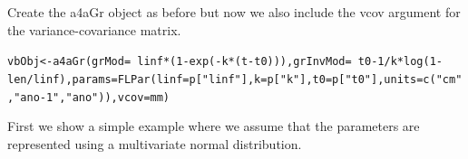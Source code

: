 \documentclass[a4paper,english,10pt]{article}\usepackage[]{graphicx}\usepackage[]{color}
\makeatletter
\newcommand{\hlnum}[1]{\textcolor[rgb]{0.2,0.2,0.2}{#1}}%
\newcommand{\hlstr}[1]{\textcolor[rgb]{0.2,0.2,0.2}{#1}}%
\newcommand{\hlopt}[1]{\textcolor[rgb]{0.2,0.2,0.2}{#1}}%
\newcommand{\hlstd}[1]{\textcolor[rgb]{0,0,0}{#1}}%
\newcommand{\hlkwb}[1]{\textcolor[rgb]{0.361,0.506,0.596}{#1}}%
\newcommand{\hlkwc}[1]{\textcolor[rgb]{0.361,0.506,0.596}{#1}}%
\newcommand{\hlkwd}[1]{\textcolor[rgb]{0.361,0.506,0.596}{#1}}%
\newenvironment{kframe}{%
 \def\at@end@of@kframe{}%
 \ifinner\ifhmode%
  \def\at@end@of@kframe{\end{minipage}}%
  \begin{minipage}{\columnwidth}%
 \fi\fi%
 \def\FrameCommand##1{\hskip\@totalleftmargin \hskip-\fboxsep
 \colorbox{shadecolor}{##1}\hskip-\fboxsep
     \hskip-\linewidth \hskip-\@totalleftmargin \hskip\columnwidth}%
 \MakeFramed {\advance\hsize-\width
   \@totalleftmargin\z@ \linewidth\hsize
   \@setminipage}}%
 {\par\unskip\endMakeFramed%
 \at@end@of@kframe}
\newenvironment{knitrout}{}{} %
\newcommand{\code}[1]{{\texttt{#1}}}
\makeatother
\begin{document}
Create the a4aGr object as before but now we also include the vcov argument for the variance-covariance matrix.
\begin{knitrout}
\color{fgcolor}\begin{kframe}
\begin{alltt}
\hlstd{vbObj} \hlkwb{<-} \hlkwd{a4aGr}\hlstd{(}\hlkwc{grMod}\hlstd{=}\hlopt{~}\hlstd{linf}\hlopt{*}\hlstd{(}\hlnum{1}\hlopt{-}\hlkwd{exp}\hlstd{(}\hlopt{-}\hlstd{k}\hlopt{*}\hlstd{(t}\hlopt{-}\hlstd{t0))),} \hlkwc{grInvMod}\hlstd{=}\hlopt{~}\hlstd{t0}\hlopt{-}\hlnum{1}\hlopt{/}\hlstd{k}\hlopt{*}\hlkwd{log}\hlstd{(}\hlnum{1}\hlopt{-}\hlstd{len}\hlopt{/}\hlstd{linf),} \hlkwc{params}\hlstd{=}\hlkwd{FLPar}\hlstd{(}\hlkwc{linf}\hlstd{=p[}\hlstr{"linf"}\hlstd{],} \hlkwc{k}\hlstd{=p[}\hlstr{"k"}\hlstd{],} \hlkwc{t0}\hlstd{=p[}\hlstr{"t0"}\hlstd{],} \hlkwc{units}\hlstd{=}\hlkwd{c}\hlstd{(}\hlstr{"cm"}\hlstd{,}\hlstr{"ano-1"}\hlstd{,}\hlstr{"ano"}\hlstd{)),} \hlkwc{vcov}\hlstd{=mm)}
\end{alltt}
\end{kframe}
\end{knitrout}

First we show a simple example where we assume that the parameters are represented using a multivariate normal distribution.
\end{document}
